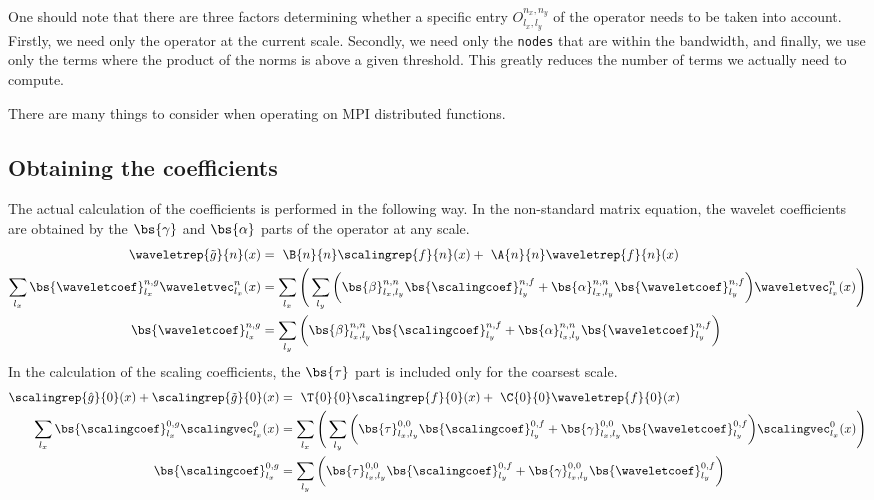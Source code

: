 One should note that there are three factors determining whether a specific
entry $O^{n_x,n_y}_{l_x,l_y}$ of the operator needs to be taken into
account. Firstly, we need only the operator at the current scale. Secondly, we
need only the \texttt{nodes} that are within the bandwidth, and finally, we use
only the terms where the product of the norms is above a given threshold. 
This greatly reduces the number of terms we actually need to compute.

There are many things to consider when operating on MPI distributed functions.

\subsection{Obtaining the coefficients}
The actual calculation of the coefficients is performed in the following way.
In the non-standard matrix equation, the wavelet coefficients are obtained by the 
$\bs{\gamma}$ and $\bs{\alpha}$ parts of the operator at any scale.
\begin{align}
    \nonumber
    \waveletrep{\tilde{g}}{n}(x) &=\ \B{n}{n}\scalingrep{f}{n}(x) +\ 
	\A{n}{n}\waveletrep{f}{n}(x)\\
    \nonumber
    \sum_{l_x} \bs{\waveletcoef}^{n,g}_{l_x}\waveletvec^n_{l_x}(x)
	&= \sum_{l_x}\Bigg(\sum_{l_y}
	\bigg(
	\bs{\beta}^{n,n}_{l_x,l_y}\bs{\scalingcoef}^{n,f}_{l_y} +
	\bs{\alpha}^{n,n}_{l_x,l_y}\bs{\waveletcoef}^{n,f}_{l_y}\bigg)
	\waveletvec_{l_x}^n(x)\Bigg)\\
    \bs{\waveletcoef}^{n,g}_{l_x} &= 
	\sum_{l_y}\bigg(
	\bs{\beta}^{n,n}_{l_x,l_y}\bs{\scalingcoef}^{n,f}_{l_y} + 
	\bs{\alpha}^{n,n}_{l_x,l_y}\bs{\waveletcoef}^{n,f}_{l_y}\bigg)
\end{align}
In the calculation of the scaling coefficients, the $\bs{\tau}$ part is
included only for the coarsest scale.
\begin{align}
    \nonumber
    \scalingrep{\hat{g}}{0}(x) + \scalingrep{\tilde{g}}{0}(x) 
    &=\ \T{0}{0}\scalingrep{f}{0}(x) +\ \C{0}{0}\waveletrep{f}{0}(x)\\
    \nonumber
    \sum_{l_x} \bs{\scalingcoef}^{0,g}_{l_x}\scalingvec^0_{l_x}(x)
	&= \sum_{l_x}\Bigg(\sum_{l_y}
	\bigg(
	\bs{\tau}^{0,0}_{l_x,l_y}\bs{\scalingcoef}^{0,f}_{l_y} +
	\bs{\gamma}^{0,0}_{l_x,l_y}\bs{\waveletcoef}^{0,f}_{l_y}\bigg)
	\scalingvec_{l_x}^0(x)\Bigg)\\
    \bs{\scalingcoef}^{0,g}_{l_x} &= 
	\sum_{l_y}\bigg(
	\bs{\tau}^{0,0}_{l_x,l_y}\bs{\scalingcoef}^{0,f}_{l_y} + 
	\bs{\gamma}^{0,0}_{l_x,l_y}\bs{\waveletcoef}^{0,f}_{l_y}\bigg)
\end{align}
